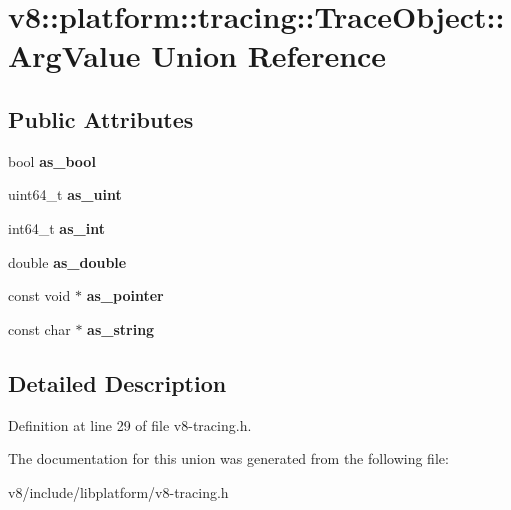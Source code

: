 \hypertarget{unionv8_1_1platform_1_1tracing_1_1TraceObject_1_1ArgValue}{}\section{v8\+:\+:platform\+:\+:tracing\+:\+:Trace\+Object\+:\+:Arg\+Value Union Reference}
\label{unionv8_1_1platform_1_1tracing_1_1TraceObject_1_1ArgValue}
\subsection*{Public Attributes}
\begin{DoxyCompactItemize}
\item 
\mbox{\label{unionv8_1_1platform_1_1tracing_1_1TraceObject_1_1ArgValue_a5321b94fe5473d33e2ab69945e16eee0}} 
bool {\bfseries as\+\_\+bool}
\item 
\mbox{\label{unionv8_1_1platform_1_1tracing_1_1TraceObject_1_1ArgValue_a70a307359d9a88811e5cfe83f2abad69}} 
uint64\+\_\+t {\bfseries as\+\_\+uint}
\item 
\mbox{\label{unionv8_1_1platform_1_1tracing_1_1TraceObject_1_1ArgValue_a538fa5c735eaadf99bf13f088cbdaf58}} 
int64\+\_\+t {\bfseries as\+\_\+int}
\item 
\mbox{\label{unionv8_1_1platform_1_1tracing_1_1TraceObject_1_1ArgValue_ad767bc3c8ca039dac75129239cdcc402}} 
double {\bfseries as\+\_\+double}
\item 
\mbox{\label{unionv8_1_1platform_1_1tracing_1_1TraceObject_1_1ArgValue_afe6b63c9eeef7d4b11a8b2665b0ad81f}} 
const void $\ast$ {\bfseries as\+\_\+pointer}
\item 
\mbox{\label{unionv8_1_1platform_1_1tracing_1_1TraceObject_1_1ArgValue_a2572f6aa4fd94641114e73f2e864b4ad}} 
const char $\ast$ {\bfseries as\+\_\+string}
\end{DoxyCompactItemize}


\subsection{Detailed Description}


Definition at line 29 of file v8-\/tracing.\+h.



The documentation for this union was generated from the following file\+:\begin{DoxyCompactItemize}
\item 
v8/include/libplatform/v8-\/tracing.\+h\end{DoxyCompactItemize}
